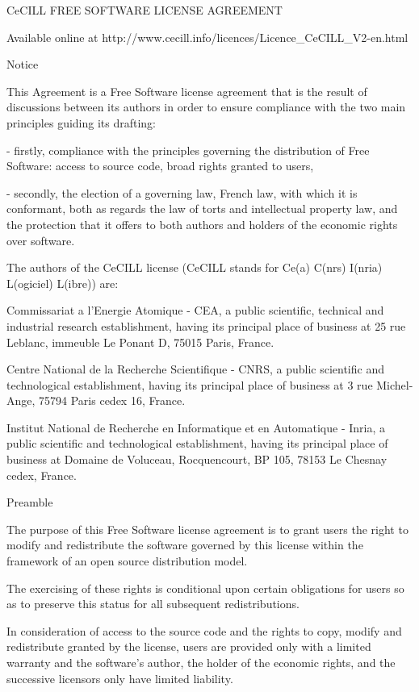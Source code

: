 \documentclass[oneside,english,onecolumn,letterpaper]{book}
\begin{document}

CeCILL FREE SOFTWARE LICENSE AGREEMENT

Available online at http://www.cecill.info/licences/Licence\_CeCILL\_V2-en.html

Notice

This Agreement is a Free Software license agreement that is the result of discussions between its authors in order to ensure compliance with the two main principles guiding its drafting:

- firstly, compliance with the principles governing the distribution of Free Software: access to source code, broad rights granted to users,

- secondly, the election of a governing law, French law, with which it is conformant, both as regards the law of torts and intellectual property law, and the protection that it offers to both authors and holders of the economic rights over software.

The authors of the CeCILL license (CeCILL stands for Ce(a) C(nrs) I(nria)
L(ogiciel) L(ibre)) are:

Commissariat a l'Energie Atomique - CEA, a public scientific, technical and industrial research establishment, having its principal place of business at 25 rue Leblanc, immeuble Le Ponant D, 75015 Paris, France.

Centre National de la Recherche Scientifique - CNRS, a public scientific and technological establishment, having its principal place of business at 3 rue Michel-Ange, 75794 Paris cedex 16, France.

Institut National de Recherche en Informatique et en Automatique - Inria, a public scientific and technological establishment, having its principal place of business at Domaine de Voluceau, Rocquencourt, BP 105, 78153 Le Chesnay cedex, France.

Preamble

The purpose of this Free Software license agreement is to grant users the right to modify and redistribute the software governed by this license within the framework of an open source distribution model.

The exercising of these rights is conditional upon certain obligations for users so as to preserve this status for all subsequent redistributions.

In consideration of access to the source code and the rights to copy, modify and redistribute granted by the license, users are provided only with a limited warranty and the software's author, the holder of the economic rights, and the successive licensors only have limited liability.
\end{document}
